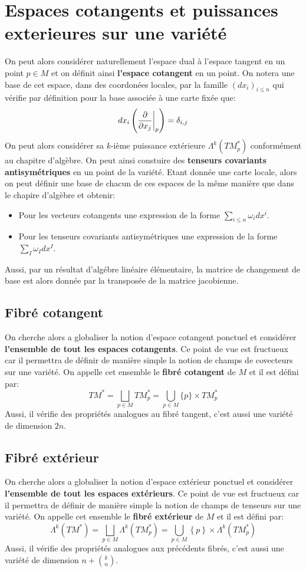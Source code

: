 \chapter{Espaces cotangents et puissances exterieures sur une variété}
   On peut alors considérer naturellement l'espace dual à l'espace tangent en un point \( p \in M \) et on définit ainsi \textbf{l'espace cotangent} en un point. On notera une base de cet espace, dans des coordonées locales, par la famille \( (dx_i)_{i \leq n} \) qui vérifie par définition pour la base associée à une carte fixée que:
   \[ 
      dx_i\left(\frac{\partial }{\partial x_j}\biggr|_p\right) = \delta_{i, j}
   \]
   On peut alors considérer sa \( k \)-ième puissance extérieure \( \Lambda^k(TM_p^*) \) conformément au chapitre d'algèbre. On peut ainsi constuire des \textbf{tenseurs covariants antisymétriques} en un point de la variété. Etant donnée une carte locale, alors on peut définir une base de chacun de ces espaces de la même manière que dans le chapire d'algèbre et obtenir:
   \begin{itemize}
      \item Pour les vecteurs cotangents une expression de la forme \( \sum_{i \leq n} \omega_idx^i \).
      \item Pour les tenseurs covariants antisymétriques une expression de la forme \( \sum_{I} \omega_Idx^I \).
   \end{itemize}
   Aussi, par un résultat d'algébre linéaire élémentaire, la matrice de changement de base est alors donnée par la transposée de la matrice jacobienne.
   \section{Fibré cotangent}
      On cherche alors a globaliser la notion d'espace cotangent ponctuel et considérer \textbf{l'ensemble de tout les espaces cotangents}. Ce point de vue est fructueux car il permettra de définir de manière simple la notion de champs de covecteurs sur une variété. On appelle cet ensemble le \textbf{fibré cotangent} de \( M \) et il est défini par:
      \[ 
         TM^* = \bigsqcup_{p \in M} TM^*_p = \bigcup_{p \in M} \{p\} \times TM^*_p
      \]
      Aussi, il vérifie des propriétés analogues au fibré tangent, c'est aussi une variété de dimension \( 2n \). 
   \section{Fibré extérieur}
      On cherche alors a globaliser la notion d'espace extérieur ponctuel et considérer \textbf{l'ensemble de tout les espaces extérieurs}. Ce point de vue est fructueux car il permettra de définir de manière simple la notion de champs de tenseurs sur une variété. On appelle cet ensemble le \textbf{fibré extérieur} de \( M \) et il est défini par:
      \[ 
         \Lambda^k(TM^*) = \bigsqcup_{p \in M} \Lambda^k(TM_p^*) = \bigcup_{p \in M} \left\{ p \right\} \times \Lambda^k(TM_p^*) 
      \]
      Aussi, il vérifie des propriétés analogues aux précédents fibrés, c'est aussi une variété de dimension \( n + \binom{k}{n} \). 
